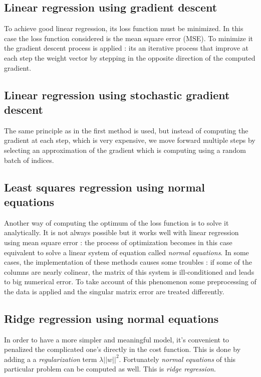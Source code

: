 \documentclass[10pt,conference,compsocconf]{IEEEtran}
\begin{document}
\subsection{Linear regression using gradient descent}
To achieve good linear regression, its loss function must be minimized. In this case the loss function considered is the mean square error (MSE). To minimize it the gradient descent process is applied : its an iterative process that improve at each step the weight vector by stepping in the opposite direction of the computed gradient. 

\subsection{Linear regression using stochastic gradient descent}
The same principle as in the first method is used, but instead of computing the gradient at each step, which is very expensive, we move forward multiple steps by selecting an approximation of the gradient which is computing using a random batch of indices.

\subsection{Least squares regression using normal equations}
Another way of computing the optimum of the loss function is to solve it analytically. It is not always possible but it works well with linear regression using mean square error : the process of optimization becomes in this case equivalent to solve a linear system of equation called \textit{normal equations}. In some cases, the implementation of these methods causes some troubles : if some of the columns are nearly colinear, the matrix of this system is ill-conditioned and leads to big numerical error. To take account of this phenomenon some preprocessing of the data is applied and the singular matrix error are treated differently. 

\subsection{Ridge regression using normal equations}
In order to have a more simpler and meaningful model, it's convenient to penalized the complicated one's directly in the cost function. This is done by adding a a \textit{regularization} term $\lambda \vert\vert w \vert\vert ^2$. Fortunately \textit{normal equations} of this particular problem can be computed as well. This is \textit{ridge regression}.
\end{document}
